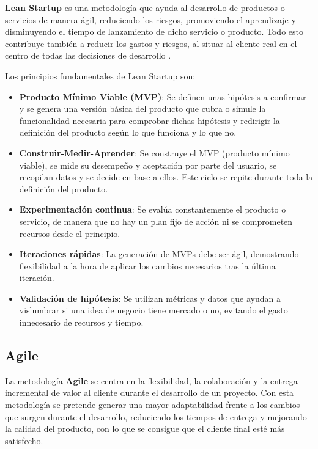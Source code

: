 \textbf{Lean Startup} es una metodología que ayuda al desarrollo de productos o servicios de manera ágil, reduciendo los riesgos, promoviendo el aprendizaje y disminuyendo el tiempo de lanzamiento de dicho servicio o producto. Todo esto contribuye también a reducir los gastos y riesgos, al situar al cliente real en el centro de todas las decisiones de desarrollo \cite{leanstartup}.

Los principios fundamentales de Lean Startup son:

\begin{itemize}
  \item \textbf{Producto Mínimo Viable (MVP)}: Se definen unas hipótesis a confirmar y se genera una versión básica del producto que cubra o simule la funcionalidad necesaria para comprobar dichas hipótesis y redirigir la definición del producto según lo que funciona y lo que no.

  \item \textbf{Construir-Medir-Aprender}: Se construye el MVP (producto mínimo viable), se mide su desempeño y aceptación por parte del usuario, se recopilan datos y se decide en base a ellos. Este ciclo se repite durante toda la definición del producto.

  \item \textbf{Experimentación continua}: Se evalúa constantemente el producto o servicio, de manera que no hay un plan fijo de acción ni se comprometen recursos desde el principio.

  \item \textbf{Iteraciones rápidas}: La generación de MVPs debe ser ágil, demostrando flexibilidad a la hora de aplicar los cambios necesarios tras la última iteración.

  \item \textbf{Validación de hipótesis}: Se utilizan métricas y datos que ayudan a vislumbrar si una idea de negocio tiene mercado o no, evitando el gasto innecesario de recursos y tiempo.
\end{itemize}

\subsection{Agile}

La metodología \textbf{Agile} se centra en la flexibilidad, la colaboración y la entrega incremental de valor al cliente durante el desarrollo de un proyecto. Con esta metodología se pretende generar una mayor adaptabilidad frente a los cambios que surgen durante el desarrollo, reduciendo los tiempos de entrega y mejorando la calidad del producto, con lo que se consigue que el cliente final esté más satisfecho.

